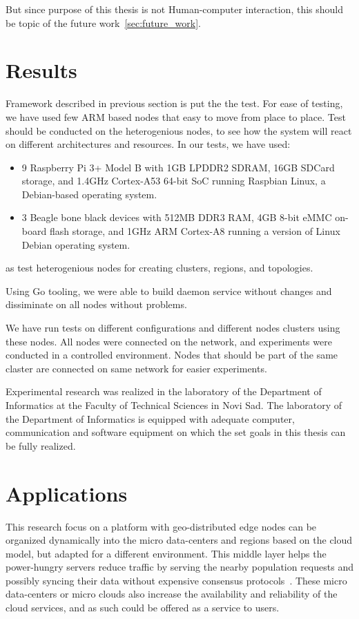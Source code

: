 But since purpose of this thesis is not Human-computer interaction, this should be topic of the future work~\ref{sec:future_work}.
%
%
\section{Results}\label{sec:results} 
Framework described in previous section is put the the test. For ease of testing, we have used few ARM based nodes that easy to move from place to place. Test should be conducted on the heterogenious nodes, to see how the system will react on different architectures and resources. In our tests, we have used:

\begin{itemize}
	\item 9 Raspberry Pi 3+ Model B with 1GB LPDDR2 SDRAM, 16GB SDCard storage, and 1.4GHz Cortex-A53 64-bit SoC running Raspbian Linux, a Debian-based operating system.
	\item 3 Beagle bone black devices with 512MB DDR3 RAM, 4GB 8-bit eMMC on-board flash storage, and 1GHz ARM Cortex-A8 running a version of Linux Debian operating system.
\end{itemize}

\noindent
as test heterogenious nodes for creating clusters, regions, and topologies. 

Using Go tooling, we were able to build daemon service without changes and dissiminate on all nodes without problems.

We have run tests on different configurations and different nodes clusters using these nodes. All nodes were connected on the network, and experiments were conducted in a controlled environment. Nodes that should be part of the same claster are connected on same network for easier experiments.

Experimental research was realized in the laboratory of the Department of Informatics at the Faculty of Technical Sciences in Novi Sad. The laboratory of the Department of Informatics is equipped with adequate computer, communication and software equipment on which the set goals in this thesis can be fully realized.
%
%
\section{Applications}\label{sec:app}
%
This research focus on a platform with geo-distributed edge nodes can be organized dynamically into the micro data-centers and regions based on the cloud model, but adapted for a different environment. This middle layer helps the power-hungry servers reduce traffic by serving the nearby population requests and possibly syncing their data without expensive consensus protocols~\cite{inproceedingsSimic2}. These micro data-centers or micro clouds also increase the availability and reliability of the cloud services, and as such could be offered as a service to users.


